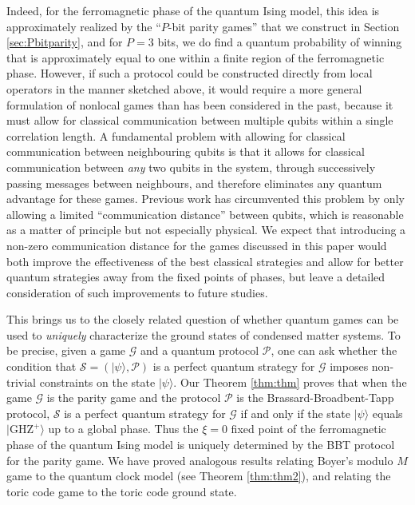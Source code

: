 \documentclass[prb,twocolumn,showpacs,amssymb,superscriptaddress]{revtex4-2}
\begin{document}
Indeed, for the ferromagnetic phase of the quantum Ising model, this idea is approximately realized by the ``$P$-bit parity games'' that we construct in Section \ref{sec:Pbitparity}, and for $P=3$ bits, we do find a quantum probability of winning that is approximately equal to one within a finite region of the ferromagnetic phase. However, if such a protocol could be constructed directly from local operators in the manner sketched above, it would require a more general formulation of nonlocal games than has been considered in the past\cite{Brassard2005}, because it must allow for classical communication between multiple qubits within a single correlation length. A fundamental problem with allowing for classical communication between neighbouring qubits is that it allows for classical communication between \emph{any} two qubits in the system, through successively passing messages between neighbours, and therefore eliminates any quantum advantage for these games. Previous work has circumvented this problem by only allowing a limited ``communication distance'' between qubits\cite{Cluster}, which is reasonable as a matter of principle but not especially physical. We expect that introducing a non-zero communication distance for the games discussed in this paper would both improve the effectiveness of the best classical strategies and allow for better quantum strategies away from the fixed points of phases, but leave a detailed consideration of such improvements to future studies.

This brings us to the closely related question of whether quantum games can be used to \emph{uniquely} characterize the ground states of condensed matter systems. To be precise, given a game $\mathcal{G}$ and a quantum protocol $\mathcal{P}$, one can ask whether the condition that $\mathcal{S} = (|\psi\rangle,\mathcal{P})$ is a perfect quantum strategy for $\mathcal{G}$ imposes non-trivial constraints on the state $|\psi\rangle$. Our Theorem \ref{thm:thm} proves that when the game $\mathcal{G}$ is the parity game and the protocol $\mathcal{P}$ is the Brassard-Broadbent-Tapp protocol, $\mathcal{S}$ is a perfect quantum strategy for $\mathcal{G}$ if and only if the state $|\psi\rangle$ equals $|\mathrm{GHZ}^+\rangle$ up to a global phase. Thus the $\xi=0$ fixed point of the ferromagnetic phase of the quantum Ising model is uniquely determined by the BBT protocol for the parity game. We have proved analogous results relating Boyer's modulo $M$ game to the quantum clock model (see Theorem \ref{thm:thm2}), and relating the toric code game to the toric code ground state\cite{companion}. 
\end{document}
